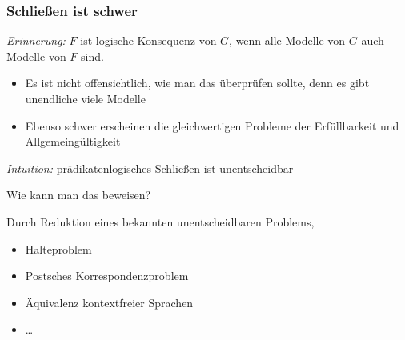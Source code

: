 \documentclass[aspectratio=1610,onlymath]{beamer}
\begin{document}
\maketitle

\begin{frame}\frametitle{Schließen ist schwer}

\emph{Erinnerung:} $F$ ist logische Konsequenz von $G$, wenn alle Modelle von $G$ auch Modelle von $F$ sind.
\begin{itemize}
\item Es ist nicht offensichtlich, wie man das überprüfen sollte, denn es gibt unendliche viele Modelle
\item Ebenso schwer erscheinen die gleichwertigen Probleme der Erfüllbarkeit und Allgemeingültigkeit
\end{itemize}\pause
\emph{Intuition:} prädikatenlogisches Schließen ist unentscheidbar
\bigskip

\alert{Wie kann man das beweisen?}\pause\bigskip

Durch Reduktion eines bekannten unentscheidbaren Problems, 
\begin{itemize}
\item Halteproblem
\item Postsches Korrespondenzproblem
\item Äquivalenz kontextfreier Sprachen
\item \ldots
\end{itemize}

\end{frame}
\end{document}
